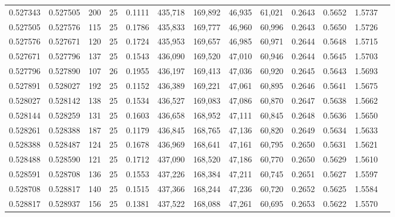 \begin{tabular}{rrrrrrrrrrrrr}
0.527343 & 0.527505 &   200 &  25 &                                     0.1111 & 435,718 & 169,892 &  46,935 &  61,021 & 0.2643 & 0.5652 & 1.5737 \\
0.527505 & 0.527576 &   115 &  25 &                                     0.1786 & 435,833 & 169,777 &  46,960 &  60,996 & 0.2643 & 0.5650 & 1.5726 \\
0.527576 & 0.527671 &   120 &  25 &                                     0.1724 & 435,953 & 169,657 &  46,985 &  60,971 & 0.2644 & 0.5648 & 1.5715 \\
0.527671 & 0.527796 &   137 &  25 &                                     0.1543 & 436,090 & 169,520 &  47,010 &  60,946 & 0.2644 & 0.5645 & 1.5703 \\
0.527796 & 0.527890 &   107 &  26 &                                     0.1955 & 436,197 & 169,413 &  47,036 &  60,920 & 0.2645 & 0.5643 & 1.5693 \\
0.527891 & 0.528027 &   192 &  25 &                                     0.1152 & 436,389 & 169,221 &  47,061 &  60,895 & 0.2646 & 0.5641 & 1.5675 \\
0.528027 & 0.528142 &   138 &  25 &                                     0.1534 & 436,527 & 169,083 &  47,086 &  60,870 & 0.2647 & 0.5638 & 1.5662 \\
0.528144 & 0.528259 &   131 &  25 &                                     0.1603 & 436,658 & 168,952 &  47,111 &  60,845 & 0.2648 & 0.5636 & 1.5650 \\
0.528261 & 0.528388 &   187 &  25 &                                     0.1179 & 436,845 & 168,765 &  47,136 &  60,820 & 0.2649 & 0.5634 & 1.5633 \\
0.528388 & 0.528487 &   124 &  25 &                                     0.1678 & 436,969 & 168,641 &  47,161 &  60,795 & 0.2650 & 0.5631 & 1.5621 \\
0.528488 & 0.528590 &   121 &  25 &                                     0.1712 & 437,090 & 168,520 &  47,186 &  60,770 & 0.2650 & 0.5629 & 1.5610 \\
0.528591 & 0.528708 &   136 &  25 &                                     0.1553 & 437,226 & 168,384 &  47,211 &  60,745 & 0.2651 & 0.5627 & 1.5597 \\
0.528708 & 0.528817 &   140 &  25 &                                     0.1515 & 437,366 & 168,244 &  47,236 &  60,720 & 0.2652 & 0.5625 & 1.5584 \\
0.528817 & 0.528937 &   156 &  25 &                                     0.1381 & 437,522 & 168,088 &  47,261 &  60,695 & 0.2653 & 0.5622 & 1.5570 \\

\end{tabular}
